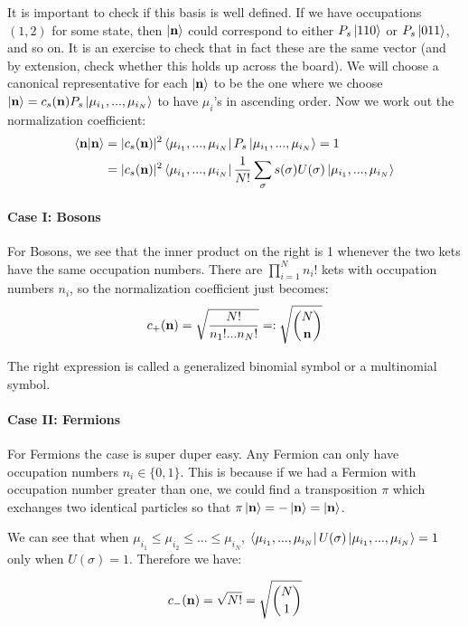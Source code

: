 It is important to check if this basis is well defined. If we have occupations $(1,2)$ for some state, then $\ket{\mathbf{n}}$ could correspond to either $P_s\ket{110}$ or $P_s\ket{011}$, and so on. It is an exercise to check that in fact these are the same vector (and by extension, check whether this holds up across the board). We will choose a canonical representative for each $\ket{\mathbf{n}}$ to be the one where we choose $\ket{\mathbf{n}} = c_s(\mathbf{n})P_s\ket{\mu_{i_1},...,\mu_{i_N}}$ to have $\mu_i$'s in ascending order. Now we work out the normalization coefficient:
\begin{align}
\braket{\mathbf{n}} &= |c_s(\mathbf{n})|^2 \bra{\mu_{i_1},...,\mu_{i_N}}P_s\ket{\mu_{i_1},...,\mu_{i_N}} = 1\\
&=  |c_s(\mathbf{n})|^2 \bra{\mu_{i_1},...,\mu_{i_N}}\frac{1}{N!}\sum_\sigma s(\sigma)U(\sigma)\ket{\mu_{i_1},...,\mu_{i_N}}
\end{align}

\paragraph*{Case I: Bosons}
For Bosons, we see that the inner product on the right is 1 whenever the two kets have the same occupation numbers. There are $\prod_{i=1}^N n_i!$ kets with occupation numbers $n_i$, so the normalization coefficient just becomes:
\begin{equation}
c_+(\mathbf{n}) = \sqrt{\frac{N!}{n_1!...n_N!}} =: \sqrt{{N\choose{\mathbf{n}}}}
\end{equation}

The right expression is called a generalized binomial symbol or a multinomial symbol. 

\paragraph*{Case II: Fermions}
For Fermions the case is super duper easy. Any Fermion can only have occupation numbers $n_i \in \{0,1\}$. This is because if we had a Fermion with occupation number greater than one, we could find a transposition $\pi$ which exchanges two identical particles so that $\pi\ket{\mathbf{n}} = -\ket{\mathbf{n}} = \ket{\mathbf{n}}$. 

We can see that when $\mu_{i_1}\leq\mu_{i_2}\leq...\leq\mu_{i_N}$, $\bra{\mu_{i_1},...,\mu_{i_N}}U(\sigma)\ket{\mu_{i_1},...,\mu_{i_N}}=1$ only when $U(\sigma) = 1$. Therefore we have:

\begin{equation}
c_-(\mathbf{n}) = \sqrt{N!} = \sqrt{{N\choose{1}}}
\end{equation}

